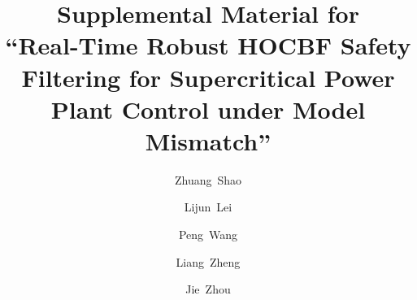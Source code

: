 \documentclass[a4paper]{elsarticle}
\begin{document}
\begin{frontmatter}
\title{Supplemental Material for\\ ``Real-Time Robust HOCBF Safety Filtering for Supercritical Power Plant Control under Model Mismatch''}

\author[1]{Zhuang~Shao}
\author[2]{Lijun~Lei}
\author[3]{Peng~Wang}
\author[2]{Liang~Zheng}
\author[2]{Jie~Zhou}


\address[1]{China Resources Power Technology Research Institute Co., Ltd., Shenzhen 518000, Guangdong Province, China}
\address[2]{Rundian Energy Science and Technology Co., Ltd., Zhengzhou 450052, Henan Province, China}
\address[3]{North China University of Water Resources and Electric Power, Zhengzhou 450046, Henan Province, China}

\end{frontmatter}




\end{document}
